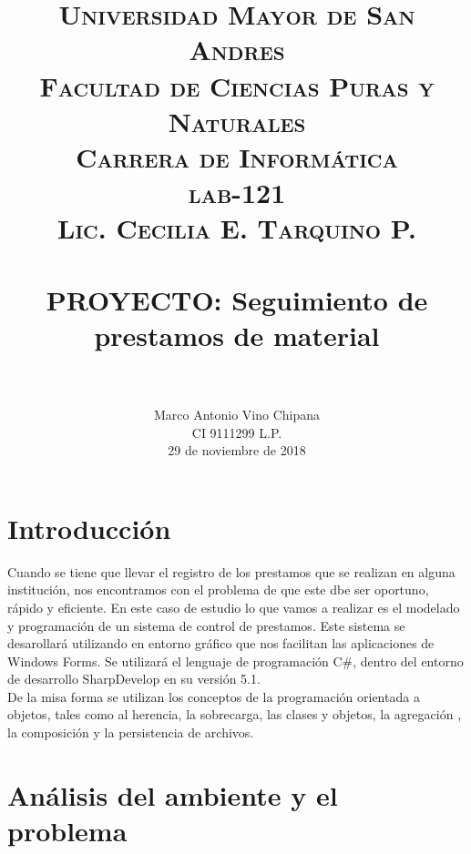 \documentclass[12pt]{article}
\title{
		\usefont{OT1}{bch}{b}{n}
		\normalfont \normalsize \textsc{Universidad Mayor de San Andres \\
        Facultad de Ciencias Puras y Naturales\\
        Carrera de Informática \\
        lab-121\\
        Lic. Cecilia E. Tarquino P.} \\ [25pt]
		\horrule{0.5pt} \\[0.2cm]
		\huge PROYECTO: Seguimiento de prestamos de material  \\
       \horrule{2pt} \\[0.1cm]
}
\author{
		\normalfont 								\normalsize
        Marco Antonio Vino Chipana	 \\
        CI 9111299 L.P.\\
        29 de noviembre de 2018\\[-3pt]		\normalsize        
}
\date{}
\begin{document}
 
\maketitle 
\thispagestyle{empty}

\newpage
\section{Introducción}

Cuando se tiene que llevar el registro de los prestamos que se realizan en alguna institución, nos encontramos con el problema de que este dbe ser oportuno, rápido y eficiente.  En este caso de estudio lo que vamos a realizar es el modelado y programación de un sistema de control de prestamos.  
Este sistema se desarollará utilizando en entorno gráfico que nos facilitan las aplicaciones de Windows Forms. Se utilizará el lenguaje de programación C\#, dentro del entorno de desarrollo SharpDevelop en su versión 5.1.  \\

De la misa forma se utilizan los conceptos de la programación orientada a objetos, tales como al herencia, la sobrecarga, las clases y objetos, la agregación , la composición y la persistencia de archivos.  

\section{Análisis del ambiente y el problema}
\end{document}
